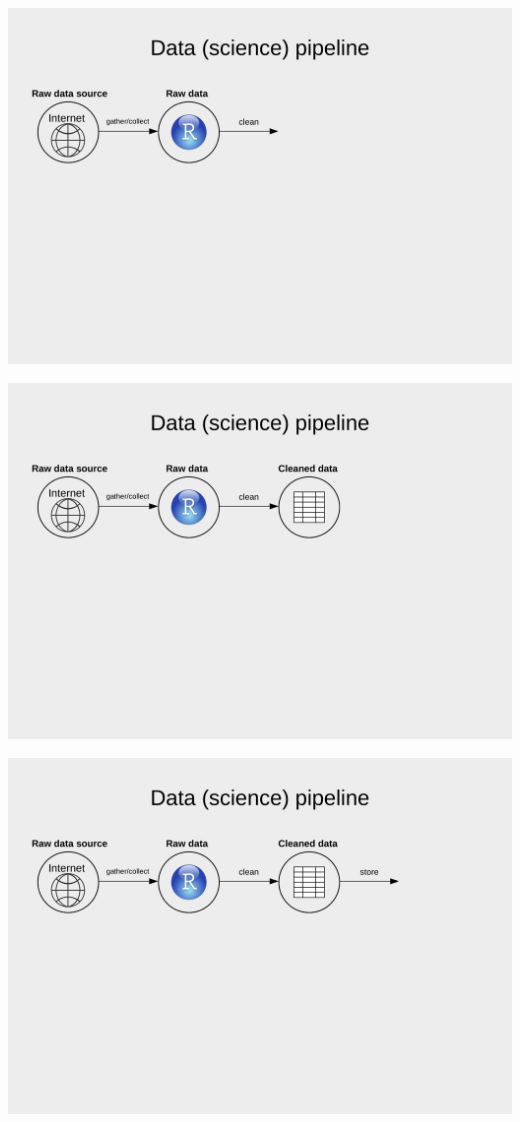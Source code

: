 \documentclass[
  ignorenonframetext,
]{beamer}
\begin{document}
\begin{frame}
\begin{center}\includegraphics[width=0.9\linewidth]{../../img/ds4} \end{center}
\end{frame}

\begin{frame}
\begin{center}\includegraphics[width=0.9\linewidth]{../../img/ds5} \end{center}
\end{frame}

\begin{frame}
\begin{center}\includegraphics[width=0.9\linewidth]{../../img/ds6} \end{center}
\end{frame}
\end{document}
